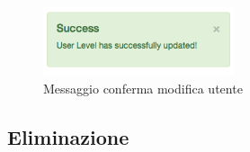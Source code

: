 \begin{enumerate}
					\begin{figure}[H]
						\centering \includegraphics[width=0.5\textwidth]{img/confirmEditUser.png}
						\caption{ \label{fig:confirmEditUser} Messaggio conferma modifica utente}
					\end{figure}

			\end{enumerate}  
	
	\clearpage
	\subsection{Eliminazione} %
	\label{utenti-eliminazione}
